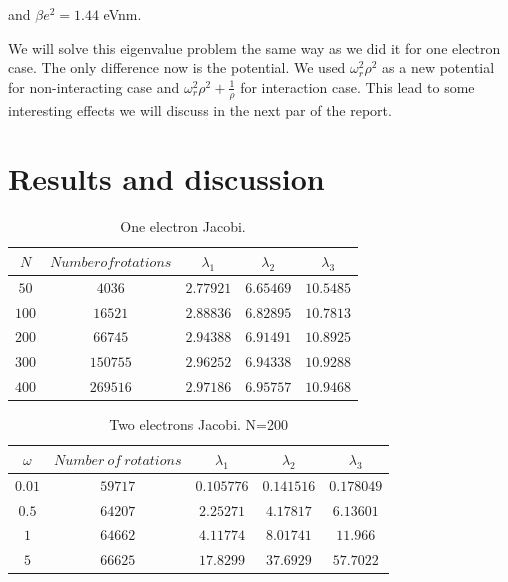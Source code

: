 \documentclass[10pt]{article}
\begin{document}
	and $\beta e^{2}=1.44$ eVnm.
	
We will solve this eigenvalue problem the same way as we did it for one
electron case. The only difference now is the potential. We used $\omega _{r}^{2}\rho ^{2} $ as a new potential for non-interacting case and  $\omega _{r}^{2}\rho ^{2}+\frac{1}{\rho }$ for interaction case. This lead to some interesting effects we will discuss in the next par of the report.

\newpage
\section{Results and discussion}

\begin{table}
  \caption{One electron Jacobi.}
  \label{tab:one}
  \begin{center}
    \begin{tabular}{c|c|c|c|c}
    \hline
		$N$ & $Number of rotations$ & $\lambda_1$ & $\lambda_2$ & $\lambda_3$ \\
        \hline
	$	50 $  & $ 4036  $ & $2.77921$ & $6.65469$ & $10.5485$ \\
	$	100$  & $ 16521 $ & $2.88836$ & $6.82895$ & $10.7813$ \\
	$	200$  & $ 66745 $ & $2.94388$ & $6.91491$ & $10.8925$ \\
	$	300$  & $ 150755$ & $2.96252$ & $6.94338$ & $10.9288$ \\
	$	400$  & $ 269516$ & $2.97186$ & $6.95757$ & $10.9468$ \\

	\end{tabular}
  \end{center}
\end{table}

\begin{table}
  \caption{Two electrons Jacobi. N=200}
  \label{tab:two}
	\begin{center}
    \begin{tabular}{c|c|c|c|c}
    \hline
		$\omega$ & $Number\ of\ rotations$ & $\lambda_1$ & $\lambda_2$ & $\lambda_3$ \\
        \hline
		$0.01$ & $59717$ & $0.105776$ & $0.141516$  & $0.178049$ \\ 
		$0.5$  & $64207$ & $2.25271 $ & $4.17817 $  & $6.13601$ \\ 
		$1  $  & $64662$ & $4.11774 $ & $8.01741 $  & $11.966$ \\
		$5  $  & $66625$ & $17.8299 $ & $37.6929 $  & $57.7022$ \\

	\end{tabular}
  \end{center}
\end{table}
\end{document}

